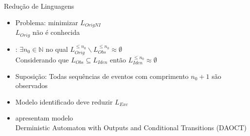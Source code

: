 \begin{frame}{Redução de Linguagens}
\begin{itemize}
\item Problema: minimizar $L_{OrigNI}$ \pause \\$L_{Orig}$ não é conhecida \pause
\item \cite{klein2005fault}:  $\exists n_0\in\mathbb{N}$ no qual
  $L_{Orig}^{\leq n_0}\backslash L_{Obs}^{\leq n_0}\approx \emptyset $  \pause \\
Considerando que $L_{Obs}\subseteq L_{Iden}$ então  $L_{Iden}^{\leq n_0}\approx
\emptyset$  \pause
\item Suposição: Todas sequências de eventos com comprimento $n_0 + 1$ são observados  \pause
\item Modelo identificado deve reduzir $L_{Exc}$ \pause
  \item \cite{moreira2018enhanced} apresentam modelo \\Derministic Automaton with
    Outputs and Conditional Transitions (DAOCT) 
\end{itemize}

\end{frame}
